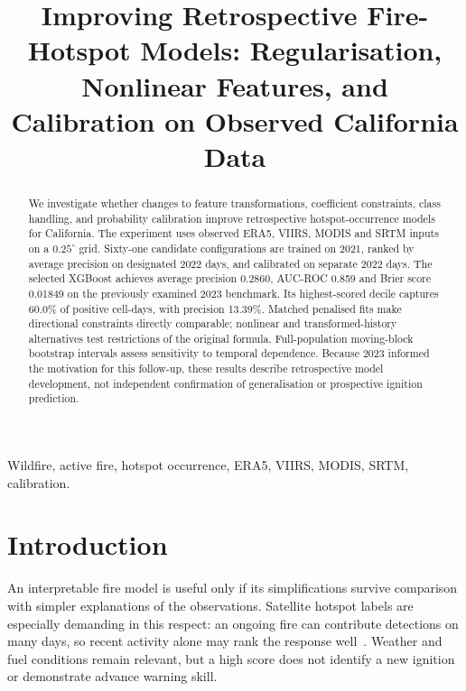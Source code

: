 \documentclass[conference]{IEEEtran}
\begin{document}
\title{Improving Retrospective Fire-Hotspot Models: Regularisation, Nonlinear Features, and Calibration on Observed California Data}
\author{
\and{}}
\maketitle
\begin{abstract}
We investigate whether changes to feature transformations, coefficient constraints, class handling, and probability calibration improve retrospective hotspot-occurrence models for California. The experiment uses observed ERA5, VIIRS, MODIS and SRTM inputs on a $0.25^\circ$ grid. Sixty-one candidate configurations are trained on 2021, ranked by average precision on designated 2022 days, and calibrated on separate 2022 days. The selected XGBoost achieves average precision 0.2860, AUC-ROC 0.859 and Brier score 0.01849 on the previously examined 2023 benchmark. Its highest-scored decile captures 60.0\% of positive cell-days, with precision 13.39\%. Matched penalised fits make directional constraints directly comparable; nonlinear and transformed-history alternatives test restrictions of the original formula. Full-population moving-block bootstrap intervals assess sensitivity to temporal dependence. Because 2023 informed the motivation for this follow-up, these results describe retrospective model development, not independent confirmation of generalisation or prospective ignition prediction.
\end{abstract}
\begin{IEEEkeywords}
Wildfire, active fire, hotspot occurrence, ERA5, VIIRS, MODIS, SRTM, calibration.
\end{IEEEkeywords}


\section{Introduction}
An interpretable fire model is useful only if its simplifications survive comparison with simpler explanations of the observations. Satellite hotspot labels are especially demanding in this respect: an ongoing fire can contribute detections on many days, so recent activity alone may rank the response well~\cite{schroeder}. Weather and fuel conditions remain relevant, but a high score does not identify a new ignition or demonstrate advance warning skill.
\end{document}
